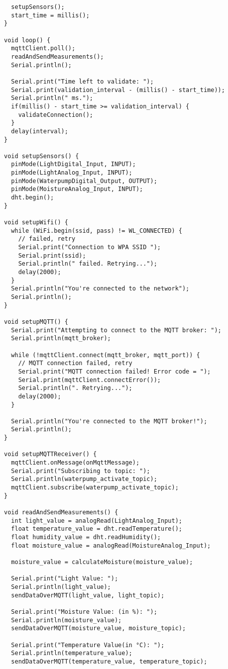 \begin{longlisting}
\begin{verbatim}
  setupSensors();
  start_time = millis();
}

void loop() {
  mqttClient.poll();
  readAndSendMeasurements();
  Serial.println();

  Serial.print("Time left to validate: ");
  Serial.print(validation_interval - (millis() - start_time));
  Serial.println(" ms.");
  if(millis() - start_time >= validation_interval) {
    validateConnection();
  }
  delay(interval);
}

void setupSensors() {
  pinMode(LightDigital_Input, INPUT);
  pinMode(LightAnalog_Input, INPUT);
  pinMode(WaterpumpDigital_Output, OUTPUT);
  pinMode(MoistureAnalog_Input, INPUT);
  dht.begin();
}

void setupWifi() {
  while (WiFi.begin(ssid, pass) != WL_CONNECTED) {
    // failed, retry
    Serial.print("Connection to WPA SSID ");
    Serial.print(ssid);
    Serial.println(" failed. Retrying...");
    delay(2000);
  }
  Serial.println("You're connected to the network");
  Serial.println();  
}

void setupMQTT() {
  Serial.print("Attempting to connect to the MQTT broker: ");
  Serial.println(mqtt_broker);

  while (!mqttClient.connect(mqtt_broker, mqtt_port)) {
    // MQTT connection failed, retry
    Serial.print("MQTT connection failed! Error code = ");
    Serial.print(mqttClient.connectError());
    Serial.println(". Retrying...");
    delay(2000);
  }

  Serial.println("You're connected to the MQTT broker!");
  Serial.println();
}

void setupMQTTReceiver() {
  mqttClient.onMessage(onMqttMessage);
  Serial.print("Subscribing to topic: ");
  Serial.println(waterpump_activate_topic);
  mqttClient.subscribe(waterpump_activate_topic);
}

void readAndSendMeasurements() {
  int light_value = analogRead(LightAnalog_Input);
  float temperature_value = dht.readTemperature();
  float humidity_value = dht.readHumidity();
  float moisture_value = analogRead(MoistureAnalog_Input);

  moisture_value = calculateMoisture(moisture_value);

  Serial.print("Light Value: ");
  Serial.println(light_value);
  sendDataOverMQTT(light_value, light_topic);

  Serial.print("Moisture Value: (in %): ");
  Serial.println(moisture_value);
  sendDataOverMQTT(moisture_value, moisture_topic);

  Serial.print("Temperature Value(in °C): ");
  Serial.println(temperature_value);
  sendDataOverMQTT(temperature_value, temperature_topic);


\end{verbatim}
\end{longlisting}

